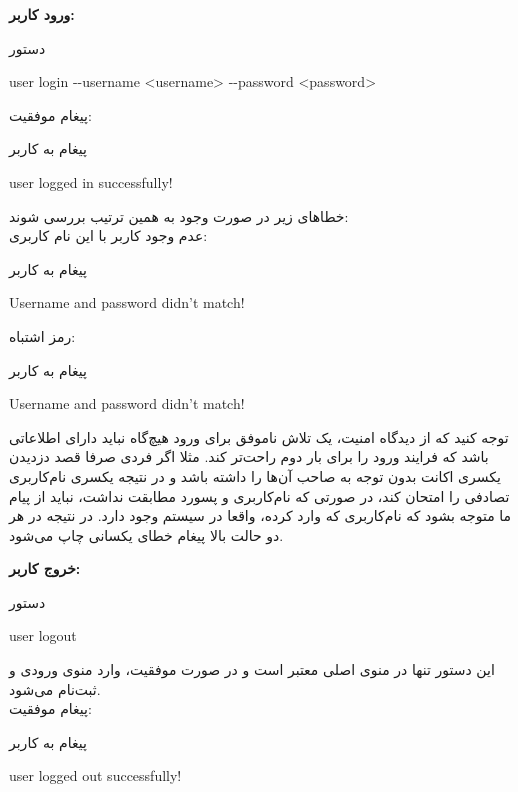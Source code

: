 \documentclass[]{article}
\begin{document}
\vspace{.5cm}
\textbf{ورود کاربر:}
\begin{mybox}[colback=yellow]{دستور}
	\begin{latin}	
		user login -{}-username <username> -{}-password <password>
	\end{latin}
\end{mybox}
پیغام موفقیت:
\begin{mybox}[colback=yellow]{پیغام به کاربر}
	\begin{latin}	
		user logged in successfully!
	\end{latin}
\end{mybox}
خطا‌های زیر در صورت وجود به همین ترتیب بررسی شوند:
\\
عدم وجود کاربر با این نام کاربری:
\begin{mybox}[colback=yellow]{پیغام به کاربر}
	\begin{latin}	
		Username and password didn’t match!
	\end{latin}
\end{mybox}
رمز اشتباه:
\begin{mybox}[colback=yellow]{پیغام به کاربر}
	\begin{latin}	
		Username and password didn’t match!
	\end{latin}
\end{mybox}
توجه کنید که از دیدگاه امنیت، یک تلاش ناموفق برای ورود هیچ‌گاه نباید دارای 
اطلاعاتی باشد که فرایند ورود را برای بار دوم راحت‌تر کند. مثلا اگر فردی 
صرفا 
قصد دزدیدن یکسری اکانت بدون توجه به صاحب آن‌ها را داشته باشد و در نتیجه 
یکسری نام‌کاربری تصادفی را امتحان کند، در صورتی که نام‌کاربری و پسورد مطابقت 
نداشت، نباید از پیام ما متوجه بشود که نام‌کاربری که وارد کرده، واقعا در 
سیستم وجود دارد. در نتیجه در هر دو حالت بالا پیغام خطای یکسانی چاپ می‌شود.

\vspace{.5cm}
\textbf{خروج کاربر:}
\begin{mybox}[colback=yellow]{دستور}
	\begin{latin}	
		user logout
	\end{latin}
\end{mybox}
این دستور تنها در منوی اصلی معتبر است و در صورت موفقیت، وارد منوی ورودی و 
ثبت‌نام می‌شود.
\\
پیغام موفقیت:
\begin{mybox}[colback=yellow]{پیغام به کاربر}
	\begin{latin}	
		user logged out successfully!
	\end{latin}
\end{mybox}
\end{document}
